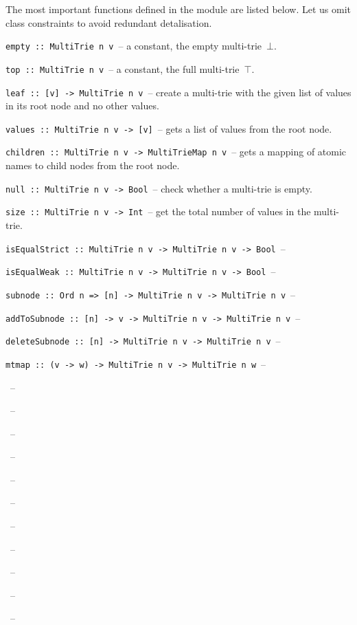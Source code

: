 \documentclass{article}
\theoremstyle{definition}
\begin{document}
The most important functions defined in the module are listed below. Let us
omit class constraints to avoid redundant detalisation.

\lstinline{empty :: MultiTrie n v}~-- a constant, the empty multi-trie~$\bot$.

\lstinline{top :: MultiTrie n v}~-- a constant, the full multi-trie~$\top$.

\lstinline{leaf :: [v] -> MultiTrie n v}~-- create a multi-trie with the given
list of values in its root node and no other values.

\lstinline{values :: MultiTrie n v -> [v]}~-- gets a list of values from the
root node.

\lstinline{children :: MultiTrie n v -> MultiTrieMap n v}~-- gets a mapping
of atomic names to child nodes from the root node.

\lstinline{null :: MultiTrie n v -> Bool}~-- check whether a multi-trie is
empty.

\lstinline{size :: MultiTrie n v -> Int}~-- get the total number of values in
the multi-trie.

\lstinline{isEqualStrict :: MultiTrie n v -> MultiTrie n v -> Bool}~--

\lstinline{isEqualWeak :: MultiTrie n v -> MultiTrie n v -> Bool}~--

\lstinline{subnode :: Ord n => [n] -> MultiTrie n v -> MultiTrie n v}~--

\lstinline{addToSubnode :: [n] -> v -> MultiTrie n v -> MultiTrie n v}~--

\lstinline{deleteSubnode :: [n] -> MultiTrie n v -> MultiTrie n v}~--

\lstinline{mtmap :: (v -> w) -> MultiTrie n v -> MultiTrie n w}~--

\lstinline{}~--

\lstinline{}~--

\lstinline{}~--

\lstinline{}~--

\lstinline{}~--

\lstinline{}~--

\lstinline{}~--

\lstinline{}~--

\lstinline{}~--

\lstinline{}~--

\lstinline{}~--
\end{document}

